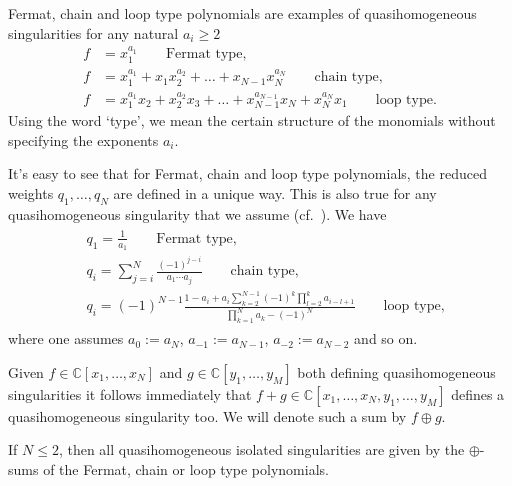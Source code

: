 \documentclass[10pt,a4paper]{article}
\numberwithin{equation}{section}
\newcommand{\CC}{{\mathbb{C}}}
\begin{document}
\begin{Example}
 Fermat, chain and loop type polynomials are examples of quasihomogeneous singularities for any natural $a_i \ge 2$
 \begin{align*}
	 f &= x_1^{a_1} \qquad \text{Fermat type},
	 \\
	 f &= x_1^{a_1} + x_1 x_2^{a_2} + \dots + x_{N-1} x_N^{a_N} \qquad \text{chain type},
	 \\
	 f &= x_1^{a_1}x_2 + x_2^{a_2}x_3 + \dots + x_{N-1}^{a_{N-1}}x_N + x_N^{a_N}x_1 \qquad \text{loop type}.
 \end{align*}
 Using the word `type', we mean the certain structure of the monomials without specifying the exponents $a_i$.
\end{Example}

It's easy to see that for Fermat, chain and loop type polynomials, the reduced weights $q_1,\dots,q_N$ are defined in a unique way. This is also true for any quasihomogeneous singularity that we assume (cf.\ \cite[Korollar~1.7]{S71}). We have
\begin{align*}
\begin{split}
 & q_1 = \frac{1}{a_1} \qquad \text{Fermat type,}
 \\
 & q_i = \sum_{j=i}^N\frac{(-1)^{j-i}}{a_1\cdots a_j} \qquad \text{chain type,}
 \\
 & q_i = (-1)^{N-1}\frac{1 - a_i + a_i \sum_{k=2}^{N-1} (-1)^k \prod_{l=2}^k a_{i-l+1}}{\prod_{k=1}^N a_k - (-1)^N} \qquad \text{loop type,}
 \end{split}
\end{align*}
where one assumes $a_0 := a_N$, $a_{-1} := a_{N-1}$, $a_{-2} := a_{N-2}$ and so on.


Given $f \in \CC[x_1,\dots,x_N]$ and $g \in \CC[y_1,\dots,y_M]$ both defining quasihomogeneous singularities it follows immediately that $f+g \in \CC[x_1,\dots,x_N,y_1,\dots,y_M]$ defines a quasihomogeneous singularity too. We will denote such a sum by $f \oplus g$.

\begin{Example}
If $N \le 2$, then all quasihomogeneous isolated singularities are given by the $\oplus$-sums of the Fermat, chain or loop type polynomials.
\end{Example}
\end{document}

